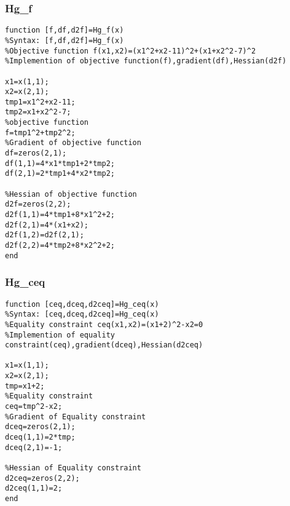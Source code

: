 


\subsubsection{\bfseries Hg_f }
\label{6.5.4}
{\setmainfont{Courier New Bold} \scriptsize         
\begin{lstlisting}
function [f,df,d2f]=Hg_f(x)
%Syntax: [f,df,d2f]=Hg_f(x) 
%Objective function f(x1,x2)=(x1^2+x2-11)^2+(x1+x2^2-7)^2
%Implemention of objective function(f),gradient(df),Hessian(d2f)

x1=x(1,1);
x2=x(2,1);
tmp1=x1^2+x2-11;
tmp2=x1+x2^2-7;
%objective function
f=tmp1^2+tmp2^2;
%Gradient of objective function
df=zeros(2,1);
df(1,1)=4*x1*tmp1+2*tmp2;
df(2,1)=2*tmp1+4*x2*tmp2;

%Hessian of objective function
d2f=zeros(2,2);
d2f(1,1)=4*tmp1+8*x1^2+2;
d2f(2,1)=4*(x1+x2);
d2f(1,2)=d2f(2,1);
d2f(2,2)=4*tmp2+8*x2^2+2;
end
\end{lstlisting}}
\subsubsection{\bfseries Hg_ceq }
\label{6.5.5}
{\setmainfont{Courier New Bold} \scriptsize         
\begin{lstlisting}
function [ceq,dceq,d2ceq]=Hg_ceq(x)
%Syntax: [ceq,dceq,d2ceq]=Hg_ceq(x) 
%Equality constraint ceq(x1,x2)=(x1+2)^2-x2=0
%Implemention of equality constraint(ceq),gradient(dceq),Hessian(d2ceq)

x1=x(1,1);
x2=x(2,1);
tmp=x1+2;
%Equality constraint 
ceq=tmp^2-x2;
%Gradient of Equality constraint
dceq=zeros(2,1);
dceq(1,1)=2*tmp;
dceq(2,1)=-1;

%Hessian of Equality constraint
d2ceq=zeros(2,2);
d2ceq(1,1)=2;
end
\end{lstlisting}}
